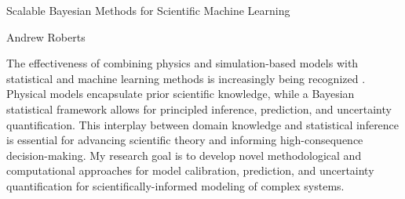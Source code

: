 \documentclass[12pt]{article}
\begin{document}
\begin{center}
Scalable Bayesian Methods for Scientific Machine Learning
\end{center}

\begin{flushright}
Andrew Roberts
\end{flushright} 

The effectiveness of combining physics and simulation-based models with statistical and machine learning methods is increasingly being recognized \cite{Willcox}. Physical models
encapsulate prior scientific knowledge, while a Bayesian statistical framework allows for principled inference, prediction, and uncertainty quantification. This interplay between domain 
knowledge and statistical inference is essential for advancing scientific theory and informing high-consequence decision-making. My research goal is to develop novel methodological 
and computational approaches for model calibration, prediction, and uncertainty quantification for scientifically-informed modeling of complex systems. 
\end{document}
